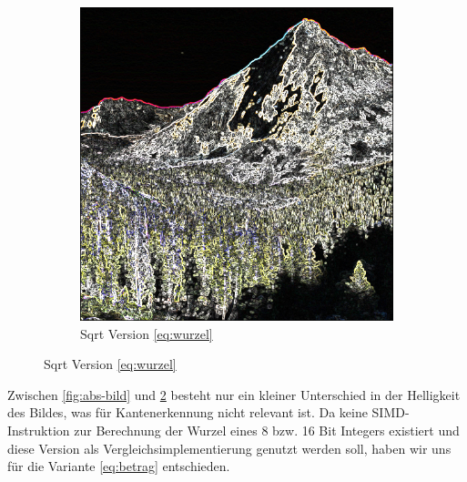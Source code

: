 \documentclass[course=erap]{aspdoc}
\begin{document}
\begin{figure}[H]
\begin{subfigure}{.5\columnwidth}
        \includegraphics[width=\columnwidth]{graphics/sqrt_sobel.png}
        \caption{Sqrt Version \ref{eq:wurzel}}
        \label{fig:sqrt-bild}
    \end{subfigure}
\end{figure}
Zwischen {\ref{fig:abs-bild}} und {\ref{fig:sqrt-bild}} besteht nur ein kleiner Unterschied in der Helligkeit des Bildes, was für Kantenerkennung nicht relevant ist.
Da keine SIMD-Instruktion zur Berechnung der Wurzel eines 8 bzw. 16 Bit Integers existiert und diese Version als Vergleichsimplementierung genutzt werden soll, haben wir uns für die Variante {\ref{eq:betrag}} entschieden.
\end{document}

